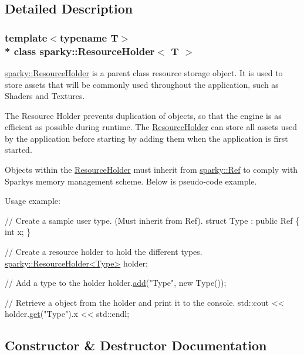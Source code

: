 \subsection{Detailed Description}
\subsubsection*{template$<$typename T$>$\\*
class sparky\+::\+Resource\+Holder$<$ T $>$}

\hyperlink{classsparky_1_1_resource_holder}{sparky\+::\+Resource\+Holder} is a parent class resource storage object. It is used to store assets that will be commonly used throughout the application, such as Shaders and Textures.

The Resource Holder prevents duplication of objects, so that the engine is as efficient as possible during runtime. The \hyperlink{classsparky_1_1_resource_holder}{Resource\+Holder} can store all assets used by the application before starting by adding them when the application is first started.

Objects within the \hyperlink{classsparky_1_1_resource_holder}{Resource\+Holder} must inherit from \hyperlink{classsparky_1_1_ref}{sparky\+::\+Ref} to comply with Sparky\textquotesingle{}s memory management scheme. Below is pseudo-\/code example.

Usage example\+: 
\begin{DoxyCode}
\textcolor{comment}{// Create a sample user type. (Must inherit from Ref).}
\textcolor{keyword}{struct }Type : \textcolor{keyword}{public} Ref
\{
    \textcolor{keywordtype}{int} x;
\}

\textcolor{comment}{// Create a resource holder to hold the different types.}
\hyperlink{classsparky_1_1_resource_holder}{sparky::ResourceHolder<Type>} holder;

\textcolor{comment}{// Add a type to the holder}
holder.\hyperlink{classsparky_1_1_resource_holder_a29eeacabc85f240b3a44e677d659fcf3}{add}(\textcolor{stringliteral}{"Type"}, \textcolor{keyword}{new} Type());

\textcolor{comment}{// Retrieve a object from the holder and print it to the console.}
std::cout << holder.\hyperlink{classsparky_1_1_resource_holder_a7eba84d365632c96abdb4f88101b0942}{get}(\textcolor{stringliteral}{"Type"}).x << std::endl;
\end{DoxyCode}
 

\subsection{Constructor \& Destructor Documentation}
